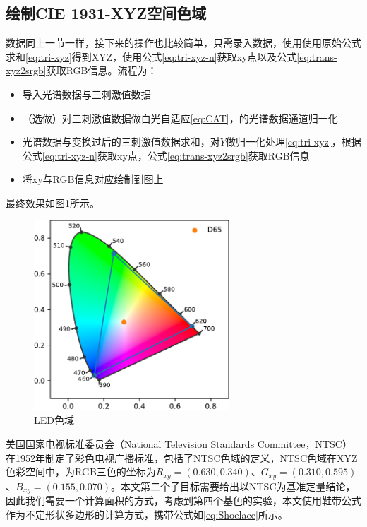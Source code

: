 \subsection{绘制CIE 1931-XYZ空间色域}

数据同上一节一样，接下来的操作也比较简单，只需录入数据，使用使用原始公式求和\eqref{eq:tri-xyz}得到XYZ，使用公式\eqref{eq:tri-xyz-n}获取xy点以及公式\eqref{eq:trans-xyz2srgb}获取RGB信息。流程为：
\begin{itemize}
    \item [1. ]导入光谱数据与三刺激值数据
    \item [2. ]（选做）对三刺激值数据做白光自适应\eqref{eq:CAT}，的光谱数据通道归一化
    \item [3. ]光谱数据与变换过后的三刺激值数据求和，对$Y$做归一化处理\eqref{eq:tri-xyz}，根据公式\eqref{eq:tri-xyz-n}获取xy点，公式\eqref{eq:trans-xyz2srgb}获取RGB信息
    \item [4. ]将xy与RGB信息对应绘制到图上
\end{itemize}
最终效果如图\ref{fig:sd1931-led}所示。

\begin{figure}[htbp]
    \centering
    \includegraphics[width=0.65\textwidth]{./imgs/sec3/cd-led.pdf}
    \caption{LED色域}
    \label{fig:sd1931-led}
\end{figure}

美国国家电视标准委员会（National Television Standards Committee，NTSC）在1952年制定了彩色电视广播标准，包括了NTSC色域的定义，NTSC色域在XYZ色彩空间中，为RGB三色的坐标为$R_{xy}=(0.630, 0.340)$、$G_{xy}=(0.310, 0.595)$、$B_{xy}=(0.155, 0.070)$。本文第二个子目标需要给出以NTSC为基准定量结论，因此我们需要一个计算面积的方式，考虑到第四个基色的实验，本文使用鞋带公式\cite{braden1986surveyor}作为不定形状多边形的计算方式，携带公式如\eqref{eq:Shoelace}所示。

